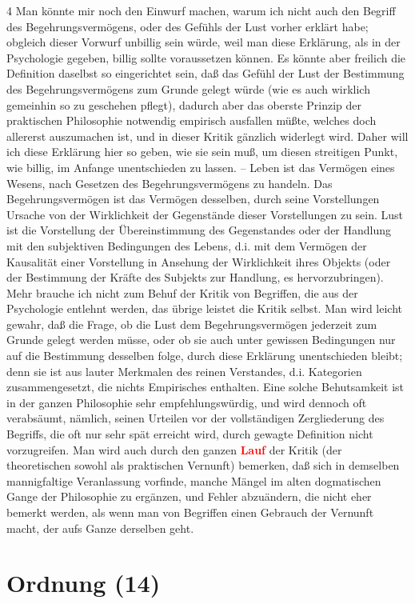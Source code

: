 \documentclass[a4paper,12pt,twoside]{book}
\newcommand{\match}[1]{\textcolor{red}{\textbf{#1}}}
\newcommand{\unnumberedsection}[1]{
	\section*{#1}
	\addcontentsline{toc}{section}{#1}
	\markright{#1}
}
\begin{document}
	4 Man könnte mir noch den Einwurf machen, warum ich nicht auch den Begriff des Begehrungsvermögens, oder des Gefühls der Lust vorher erklärt habe; obgleich dieser Vorwurf unbillig sein würde, weil man diese Erklärung, als in der Psychologie gegeben, billig sollte voraussetzen können. Es könnte aber freilich die Definition daselbst so eingerichtet sein, daß das Gefühl der Lust der Bestimmung des Begehrungsvermögens zum Grunde gelegt würde (wie es auch wirklich gemeinhin so zu geschehen pflegt), dadurch aber das oberste Prinzip der praktischen Philosophie notwendig empirisch ausfallen müßte, welches doch allererst auszumachen ist, und in dieser Kritik gänzlich widerlegt wird. Daher will ich diese Erklärung hier so geben, wie sie sein muß, um diesen streitigen Punkt, wie billig, im Anfange unentschieden zu lassen. – Leben ist das Vermögen eines Wesens, nach Gesetzen des Begehrungsvermögens zu handeln. Das Begehrungsvermögen ist das Vermögen desselben, durch seine Vorstellungen Ursache von der Wirklichkeit der Gegenstände dieser Vorstellungen zu sein. Lust ist die Vorstellung der Übereinstimmung des Gegenstandes oder der Handlung mit den subjektiven Bedingungen des Lebens, d.i. mit dem Vermögen der Kausalität einer Vorstellung in Ansehung der Wirklichkeit ihres Objekts (oder der Bestimmung der Kräfte des Subjekts zur Handlung, es hervorzubringen). Mehr brauche ich nicht zum Behuf der Kritik von Begriffen, die aus der Psychologie entlehnt werden, das übrige leistet die Kritik selbst. Man wird leicht gewahr, daß die Frage, ob die Lust dem Begehrungsvermögen jederzeit zum Grunde gelegt werden müsse, oder ob sie auch unter gewissen Bedingungen nur auf die Bestimmung desselben folge, durch diese Erklärung unentschieden bleibt; denn sie ist aus lauter Merkmalen des reinen Verstandes, d.i. Kategorien zusammengesetzt, die nichts Empirisches enthalten. Eine solche Behutsamkeit ist in der ganzen Philosophie sehr empfehlungswürdig, und wird dennoch oft verabsäumt, nämlich, seinen Urteilen vor der vollständigen Zergliederung des Begriffs, die oft nur sehr spät erreicht wird, durch gewagte Definition nicht vorzugreifen. Man wird auch durch den ganzen \match{Lauf} der Kritik (der theoretischen sowohl als praktischen Vernunft) bemerken, daß sich in demselben mannigfaltige Veranlassung vorfinde, manche Mängel im alten dogmatischen Gange der Philosophie zu ergänzen, und Fehler abzuändern, die nicht eher bemerkt werden, als wenn man von Begriffen einen Gebrauch der Vernunft macht, der aufs Ganze derselben geht. 
	
	\unnumberedsection{Ordnung (14)} 
\end{document}
